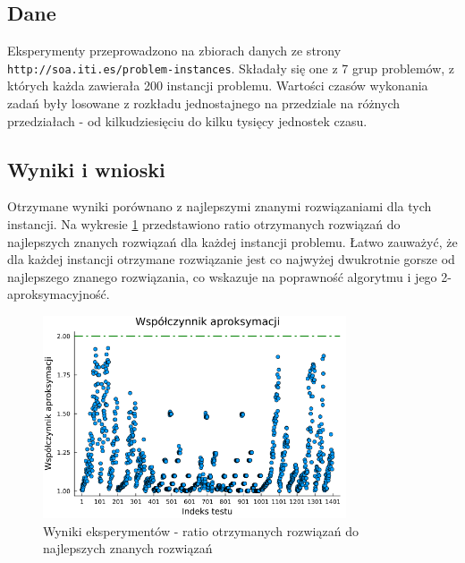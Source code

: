 \documentclass{article}
\begin{document}
\subsection{Dane}
Eksperymenty przeprowadzono na zbiorach danych ze strony \texttt{http://soa.iti.es/problem-instances}. Składały się one z 7 grup problemów, z których każda zawierała 200 instancji problemu.
Wartości czasów wykonania zadań były losowane z rozkładu jednostajnego na przedziale na różnych przedziałach - od kilkudziesięciu do kilku tysięcy jednostek czasu.

\subsection{Wyniki i wnioski}
Otrzymane wyniki porównano z najlepszymi znanymi rozwiązaniami dla tych instancji. 
Na wykresie \ref{fig:results} przedstawiono ratio otrzymanych rozwiązań do najlepszych znanych rozwiązań dla każdej instancji problemu.
Łatwo zauważyć, że dla każdej instancji otrzymane rozwiązanie jest co najwyżej dwukrotnie gorsze od najlepszego znanego rozwiązania, co wskazuje na poprawność algorytmu i jego 2-aproksymacyjność.

\begin{figure}[ht]
    \centering
    \includegraphics[width=0.8\textwidth]{../approximation_ratio_plot.png}
    \caption{Wyniki eksperymentów - ratio otrzymanych rozwiązań do najlepszych znanych rozwiązań}
    \label{fig:results}
\end{figure}
\end{document}
